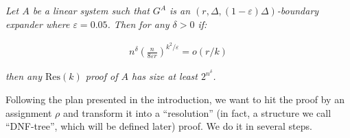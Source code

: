 \documentclass[10pt,a4paper]{article}
\begin{document}
\emph{Let $A$ be a linear system such that $G^{A}$ is an $(r,\Delta,(1-\varepsilon)\Delta)$-boundary
expander where $\varepsilon=0.05$. Then for any $\delta>0$ if:}\par


\[\begin{gathered}
n^{\delta}\left(\frac{n}{8\varepsilon r}\right)^{k^{2}/\varepsilon}=o(r/k)
\end{gathered}\]


\emph{then any $\mathrm{Res}(k)$ proof of $A$ has size at least $2^{n^{\delta}}$.}\par






Following the plan presented in the introduction, we want to hit the proof by an assignment $\rho$
and transform it into a “resolution” (in fact, a structure we call “DNF-tree”, which will be defined later) proof. We do it in several steps.\par
\end{document}
